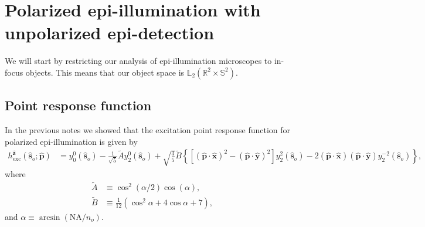 \documentclass[11pt]{article}
\providecommand{\so}[1]{\mathbf{\hat{s}}_o}
\providecommand{\mh}[1]{\mathbf{\hat{#1}}}
\providecommand{\mbb}[1]{\mathbb{#1}}
\begin{document}
\section{Polarized epi-illumination with unpolarized epi-detection}
We will start by restricting our analysis of epi-illumination microscopes to
in-focus objects. This means that our object space is
$\mbb{L}_2(\mbb{R}^2 \times \mbb{S}^2)$.

\subsection{Point response function}
In the previous notes we showed that the excitation point response function for
polarized epi-illumination is given by
\begin{align}
  h^{\mh{z}}_{\text{exc}}(\so{}; \mh{p}) &= y_0^0(\so{}) - \frac{1}{\sqrt{5}}\tilde{A}y_2^0(\so{}) + \sqrt{\frac{3}{5}}\tilde{B}\left\{[(\mh{p}\cdot\mh{x})^2 - (\mh{p}\cdot\mh{y})^2]y_2^2(\so{}) - 2(\mh{p}\cdot\mh{x})(\mh{p}\cdot\mh{y})y_2^{-2}(\so{})\right\}, \label{eq:genpsf}
\end{align}
where
\begin{subequations}
\begin{align}
  \tilde{A} &\equiv \cos^2(\alpha/2)\cos(\alpha),\\
  \tilde{B} &\equiv \frac{1}{12}(\cos^2\alpha + 4\cos\alpha + 7),
\end{align}\label{eq:coefficients}%
\end{subequations}
and $\alpha \equiv \arcsin(\text{NA}/n_o)$.
\end{document}
